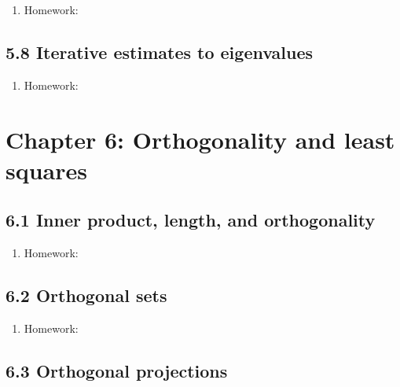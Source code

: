 \documentclass{article}
\begin{document}
\begin{enumerate}

\item Homework: 

\end{enumerate}

\subsection{5.8 Iterative estimates to eigenvalues}

\begin{enumerate}

\item Homework: 

\end{enumerate}

\section{Chapter 6: Orthogonality and least squares} 

\subsection{6.1 Inner product, length, and orthogonality}

\begin{enumerate}

\item Homework: 

\end{enumerate}

\subsection{6.2 Orthogonal sets}

\begin{enumerate}

\item Homework: 

\end{enumerate}

\subsection{6.3 Orthogonal projections}
\end{document}
